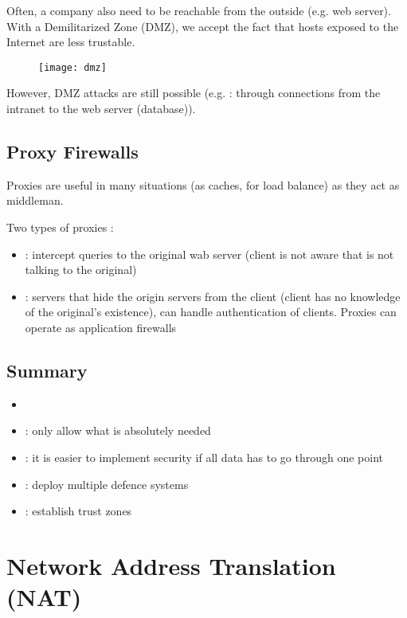 Often, a company also need to be reachable from the outside (e.g. web server). With a Demilitarized Zone (DMZ), we accept the fact that hosts exposed to the Internet are less trustable.

\begin{figure}[H]
    \centering
    \texttt{[image: dmz]}
\end{figure}

However, DMZ attacks are still possible (e.g. : through connections from the intranet to the web server (database)).

\section{Proxy Firewalls}

Proxies are useful in many situations (as caches, for load balance) as they act as middleman.

Two types of proxies :
\begin{itemize}
    \item {} : intercept queries to the original wab server (client is not aware that is not talking to the original)
    \item {} : servers that hide the origin servers from the client (client has no knowledge of the original's existence), can handle authentication of clients. Proxies can operate as application firewalls
\end{itemize}

\section{Summary}

\begin{itemize}
    \item {}
    \item {} : only allow what is absolutely needed
    \item {} : it is easier to implement security if all data has to go through one point
    \item {} : deploy multiple defence systems
    \item {} : establish trust zones
\end{itemize}

\chapter{Network Address Translation (NAT)}

